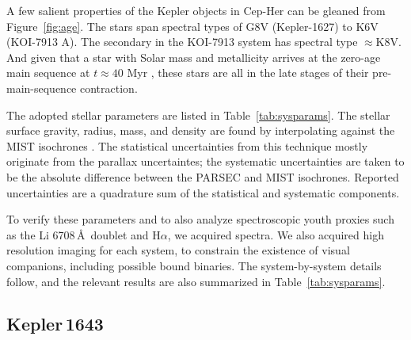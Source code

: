 \documentclass[12pt,twocolumn]{aastex63}
\begin{document}


A few salient properties of the Kepler objects in Cep-Her can be
gleaned from Figure~\ref{fig:age}.  The stars span spectral types of
G8V (Kepler-1627) to K6V (KOI-7913 A).  The secondary in the KOI-7913
system has spectral type $\approx$K8V.  And given that a star with Solar mass
and metallicity arrives at the zero-age main sequence at
$t\approx40$ Myr \citep{choi_mesa_2016}, these stars are all in the
late stages of their pre-main-sequence contraction.  

The adopted stellar parameters are listed in
Table~\ref{tab:sysparams}.  The stellar surface gravity, radius, mass,
and density are found by interpolating against the MIST isochrones
\citep{choi_mesa_2016}.  The statistical uncertainties from this
technique mostly originate from the parallax uncertaintes; the
systematic uncertainties are taken to be the absolute difference
between the PARSEC \citep{bressan_parsec_2012} and MIST isochrones.
Reported uncertainties are a quadrature sum of the statistical and
systematic components. 

To verify these parameters and to also analyze spectroscopic youth
proxies such as the Li 6708\,\AA\ doublet and H$\alpha$,
we acquired spectra.  We also acquired high resolution imaging for
each system, to constrain the existence of visual companions,
including possible bound binaries.  The system-by-system details
follow, and the relevant results are also summarized in
Table~\ref{tab:sysparams}.

\subsection{Kepler\,1643}
\end{document}
